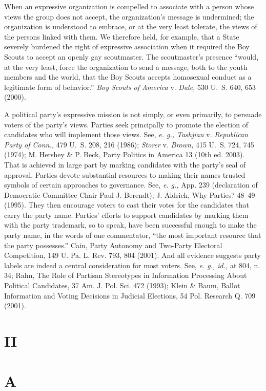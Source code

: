   When an expressive organization is compelled to associate with a
person whose views the group does not accept, the organization's
message is undermined; the organization is understood to embrace, or at
the very least tolerate, the views of the persons linked with them. We
therefore held, for example, that a State severely burdened the right
of expressive association when it required the Boy Scouts to accept an
openly gay scoutmaster. The scoutmaster's presence ``would, at the
very least, force the organization to send a message, both to the youth
members and the world, that the Boy Scouts accepts homosexual conduct
as a legitimate form of behavior.'' \emph{Boy Scouts of America} v.
\emph{Dale,} 530 U.~S. 640, 653 (2000).

  A political party's expressive mission is not simply, or even
primarily, to persuade voters of the party's views. Parties seek
principally to promote the election of candidates who will implement
those views. See, \emph{e. g., Tashjian} v. \emph{Republi\newpage can Party
of Conn.,} 479 U.~S. 208, 216 (1986); \emph{Storer} v. \emph{Brown,}
415 U.~S. 724, 745 (1974); M. Hershey \& P. Beck, Party Politics
in America 13 (10th ed. 2003). That is achieved in large part by
marking candidates with the party's seal of approval. Parties devote
substantial resources to making their names trusted symbols of certain
approaches to governance. See, \emph{e. g.,} App. 239 (declaration of
Democratic Committee Chair Paul J. Berendt); J. Aldrich, Why Parties?
48--49 (1995). They then encourage voters to cast their votes for
the candidates that carry the party name. Parties' efforts to support
candidates by marking them with the party trademark, so to speak, have
been successful enough to make the party name, in the words of one
commentator, ``the most important resource that the party possesses.''
Cain, Party Autonomy and Two-Party Electoral Competition, 149 U. Pa. L.
Rev. 793, 804 (2001). And all evidence suggests party labels are indeed
a central consideration for most voters. See, \emph{e. g., id.,} at 804,
n. 34; Rahn, The Role of Partisan Stereotypes in Information Processing
About Political Candidates, 37 Am. J. Pol. Sci. 472 (1993); Klein \&
Baum, Ballot Information and Voting Decisions in Judicial Elections, 54
Pol. Research Q. 709 (2001).

\section{II}

\section{A}

